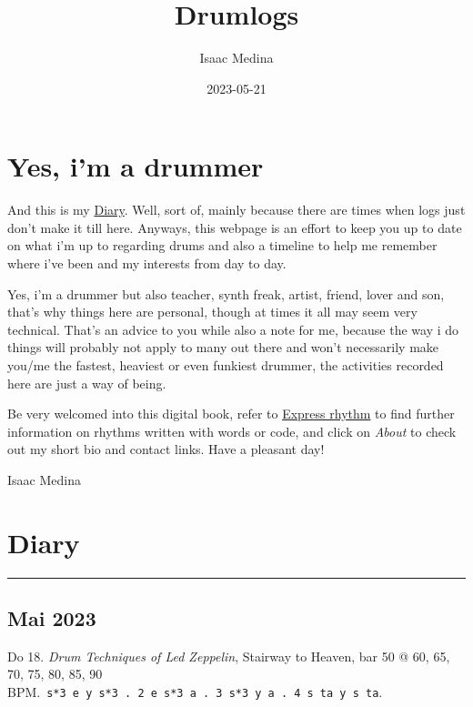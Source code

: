 \documentclass[
]{book}
\title{Drumlogs}
\author{Isaac Medina}
\date{2023-05-21}
\begin{document}
\maketitle

{
\setcounter{tocdepth}{1}
\tableofcontents
}
\hypertarget{yes-im-a-drummer}{%
\chapter*{Yes, i'm a drummer}\label{yes-im-a-drummer}}

And this is my \protect\hyperlink{Diary}{Diary}. Well, sort of, mainly because there are times when logs just don't make it till here. Anyways, this webpage is an effort to keep you up to date on what i'm up to regarding drums and also a timeline to help me remember where i've been and my interests from day to day.

Yes, i'm a drummer but also teacher, synth freak, artist, friend, lover and son, that's why things here are personal, though at times it all may seem very technical. That's an advice to you while also a note for me, because the way i do things will probably not apply to many out there and won't necessarily make you/me the fastest, heaviest or even funkiest drummer, the activities recorded here are just a way of being.

Be very welcomed into this digital book, refer to \protect\hyperlink{Express-rhythm}{Express rhythm} to find further information on rhythms written with words or code, and click on \emph{About} to check out my short bio and contact links. Have a pleasant day!

Isaac Medina

\hypertarget{Diary}{%
\chapter{Diary}\label{Diary}}

\begin{center}\rule{0.5\linewidth}{0.5pt}\end{center}

\hypertarget{mai-2023}{%
\section*{Mai 2023}\label{mai-2023}}

Do 18. \emph{Drum Techniques of Led Zeppelin}, Stairway to Heaven, bar 50 @ 60, 65, 70, 75, 80, 85, 90 BPM.~\texttt{s*3\ e\ y\ s*3\ .\ 2\ e\ s*3\ a\ .\ 3\ s*3\ y\ a\ .\ 4\ s\ ta\ y\ s\ ta}.
\end{document}
